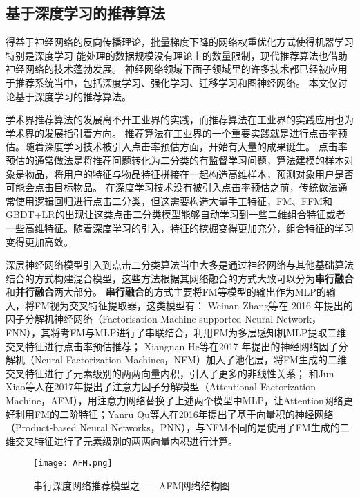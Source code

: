 \subsection{基于深度学习的推荐算法}

得益于神经网络的反向传播理论，批量梯度下降的网络权重优化方式使得机器学习特别是深度学习%
能处理的数据规模没有理论上的数量限制，现代推荐算法也借助神经网络的技术蓬勃发展。%
神经网络领域下面子领域里的许多技术都已经被应用于推荐系统当中，包括深度学习、强化学习、迁移学习和图神经网络。%
本文仅讨论基于深度学习的推荐算法。

学术界推荐算法的发展离不开工业界的实践，而推荐算法在工业界的实践应用也为学术界的发展指引着方向。
推荐算法在工业界的一个重要实践就是进行点击率预估。随着深度学习技术被引入点击率预估方面，开始有大量的成果诞生。
点击率预估的通常做法是将推荐问题转化为二分类的有监督学习问题，算法建模的样本对象是物品，将用户的特征与物品特征拼接在一起构造高维样本，预测对象用户是否可能会点击目标物品。
在深度学习技术没有被引入点击率预估之前，传统做法通常使用逻辑回归进行点击二分类，但这需要构造大量手工特征，FM、FFM和GBDT+LR的出现让这类点击二分类模型能够自动学习到一些二维组合特征或者一些高维特征。随着深度学习的引入，特征的挖掘变得更加充分，组合特征的学习变得更加高效。

深层神经网络模型引入到点击二分类算法当中大多是通过神经网络与其他基础算法结合的方式构建混合模型，这些方法根据其网络融合的方式大致可以分为\textbf{串行融合}和\textbf{并行融合}两大部分。
\textbf{串行融合}的方式主要将FM等模型的输出作为MLP的输入，将FM视为交叉特征提取器，这类模型有：
Weinan Zhang等在 2016 年提出的因子分解机神经网络（Factorisation Machine supported Neural Network，FNN），其将考FM与MLP进行了串联结合，利用FM为多层感知机MLP提取二维交叉特征进行点击率预估推荐；
Xiangnan He等在2017 年提出的神经网络因子分解机（Neural Factorization Machines，NFM）加入了池化层，将FM生成的二维交叉特征进行了元素级别的两两向量内积，引入了更多的非线性关系；
和Jun Xiao等人在2017年提出了注意力因子分解模型（Attentional Factorization Machine，AFM），用注意力网络替换了上述两个模型中MLP，让Attention网络更好利用FM的二阶特征；Yanru Qu等人在2016年提出了基于向量积的神经网络（Product-based Neural Networks，PNN），与NFM不同的是使用了FM生成的二维交叉特征进行了元素级别的两两向量内积进行计算。
\begin{figure}[htb]
  \centering
  \texttt{[image: AFM.png]}\\
  \caption{串行深度网络推荐模型之——AFM网络结构图}
  \label{fig:AFM}
\end{figure}

